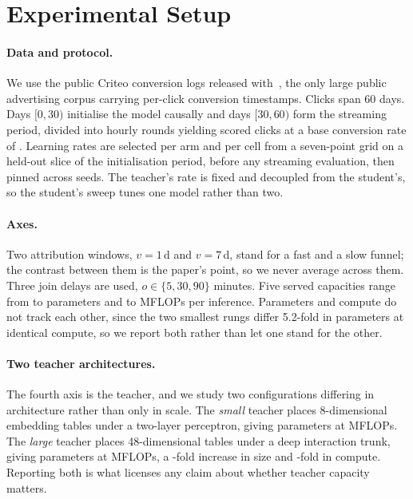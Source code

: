 \section{Experimental Setup}
\label{sec:setup}

\paragraph{Data and protocol.} We use the public Criteo conversion logs released
with~\cite{chapelle2014modeling}, the only large public advertising corpus carrying per-click
conversion timestamps. Clicks span 60 days. Days $[0,30)$ initialise the model causally and days
$[30,60)$ form the streaming period, divided into \nCohorts{} hourly rounds yielding \nEval{}
scored clicks at a base conversion rate of \baseRate{}. Learning rates are selected per arm and
per cell from a seven-point grid on a held-out slice of the initialisation period, before any
streaming evaluation, then pinned across seeds. The teacher's rate is fixed and decoupled from
the student's, so the student's sweep tunes one model rather than two.

\paragraph{Axes.} Two attribution windows, $v=1$\,d and $v=7$\,d, stand for a fast and a slow
funnel; the contrast between them is the paper's point, so we never average across them. Three
join delays are used, $o\in\{5,30,90\}$ minutes. Five served capacities range from \capMin{} to
\capMax{} parameters and \flopMin{} to \flopMax{} MFLOPs per inference. Parameters and compute
do not track each other, since the two smallest rungs differ 5.2-fold in parameters at identical
compute, so we report both rather than let one stand for the other.

\paragraph{Two teacher architectures.} The fourth axis is the teacher, and we study two
configurations differing in architecture rather than only in scale. The \emph{small} teacher
places 8-dimensional embedding tables under a two-layer perceptron, giving
\teacherSmallParams{} parameters at \teacherSmallFlops{} MFLOPs. The \emph{large} teacher places
48-dimensional tables under a deep interaction trunk, giving \teacherParams{} parameters at
\teacherFlops{} MFLOPs, a \teacherRatio{}-fold increase in size and \teacherFlopRatio{}-fold in
compute. Reporting both is what licenses any claim about whether teacher capacity matters.

